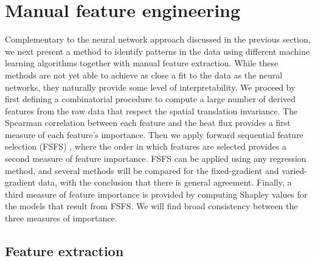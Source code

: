 \documentclass{jpp}
\begin{document}

\section{Manual feature engineering}
\label{sec:features}

Complementary to the neural network approach discussed in the previous section, we next present a method to identify patterns in the data using different machine learning algorithms together with manual feature extraction.
While these methods are not yet able to achieve as close a fit to the data as the neural networks, they naturally provide some level of interpretability.
We proceed by first defining a combinatorial procedure to compute a large number of derived features from the raw data that respect the spatial translation invariance.
The Spearman correlation between each feature and the heat flux provides a first measure of each feature's importance.
Then we apply forward sequential feature selection (FSFS) \citep{efroymson1960, whitney1971direct}, where the order in which features are selected provides a second measure of feature importance.
FSFS can be applied using any regression method, and several methods will be compared for the fixed-gradient and varied-gradient data, with the conclusion that there is general agreement.
Finally, a third measure of feature importance is provided by computing Shapley values for the models that result from FSFS.
We will find broad consistency between the three measures of importance.


\subsection{Feature extraction}
\label{sec:feature_extraction}
\end{document}
